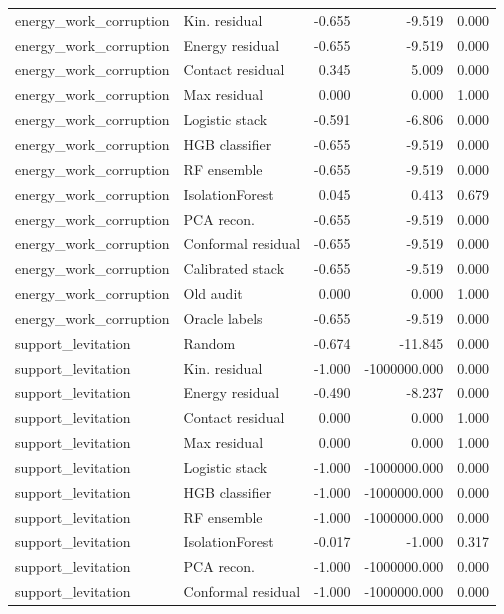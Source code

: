 {\begin{longtable}{llrrr}
energy\_work\_corruption & Kin. residual & -0.655 & -9.519 & 0.000 \\
energy\_work\_corruption & Energy residual & -0.655 & -9.519 & 0.000 \\
energy\_work\_corruption & Contact residual & 0.345 & 5.009 & 0.000 \\
energy\_work\_corruption & Max residual & 0.000 & 0.000 & 1.000 \\
energy\_work\_corruption & Logistic stack & -0.591 & -6.806 & 0.000 \\
energy\_work\_corruption & HGB classifier & -0.655 & -9.519 & 0.000 \\
energy\_work\_corruption & RF ensemble & -0.655 & -9.519 & 0.000 \\
energy\_work\_corruption & IsolationForest & 0.045 & 0.413 & 0.679 \\
energy\_work\_corruption & PCA recon. & -0.655 & -9.519 & 0.000 \\
energy\_work\_corruption & Conformal residual & -0.655 & -9.519 & 0.000 \\
energy\_work\_corruption & Calibrated stack & -0.655 & -9.519 & 0.000 \\
energy\_work\_corruption & Old audit & 0.000 & 0.000 & 1.000 \\
energy\_work\_corruption & Oracle labels & -0.655 & -9.519 & 0.000 \\
support\_levitation & Random & -0.674 & -11.845 & 0.000 \\
support\_levitation & Kin. residual & -1.000 & -1000000.000 & 0.000 \\
support\_levitation & Energy residual & -0.490 & -8.237 & 0.000 \\
support\_levitation & Contact residual & 0.000 & 0.000 & 1.000 \\
support\_levitation & Max residual & 0.000 & 0.000 & 1.000 \\
support\_levitation & Logistic stack & -1.000 & -1000000.000 & 0.000 \\
support\_levitation & HGB classifier & -1.000 & -1000000.000 & 0.000 \\
support\_levitation & RF ensemble & -1.000 & -1000000.000 & 0.000 \\
support\_levitation & IsolationForest & -0.017 & -1.000 & 0.317 \\
support\_levitation & PCA recon. & -1.000 & -1000000.000 & 0.000 \\
support\_levitation & Conformal residual & -1.000 & -1000000.000 & 0.000 \\

\end{longtable}}
